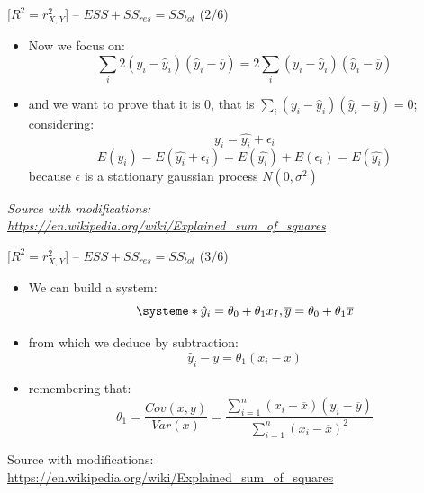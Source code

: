 \documentclass{beamer}
\begin{document}
\begin{frame}
{\centerline{ [$R^2 = r_{X,Y}^2$] -- $ESS + SS_{res} = SS_{tot} $ (2/6)}}

\begin{itemize}
\item Now we focus on:
$$\sum_i2(y_{i}-{\hat {y}}_{i})({\hat {y}}_{i}-{\overline {y}}) = 2\sum_i(y_{i}-{\hat {y}}_{i})({\hat {y}}_{i}-{\overline {y}}) $$
\item and we want to prove that it is 0, that is $\sum_i(y_{i}-{\hat {y}}_{i})({\hat {y}}_{i}-{\overline {y}}) = 0$;  considering:
$$y_i = \hat{y_i} + \epsilon_i$$
$$ E(y_i) = E(\hat{y_i} + \epsilon_i) = E(\hat{y_i}) + E(\epsilon_i) = E(\hat{y_i}) $$
because $\epsilon$ is a stationary gaussian process $N(0,\sigma^2)$

\end{itemize}

\textit{\small
Source with modifications: \url{https://en.wikipedia.org/wiki/Explained_sum_of_squares}}
\end{frame}

\begin{frame}
{\centerline{ [$R^2 = r_{X,Y}^2$] -- $ESS + SS_{res} = SS_{tot} $ (3/6)}}

\begin{itemize}
\item We can build a system:
\[
\systeme*{
\hat{y}_i = \theta_0 + \theta_{1} x_{I},
\overline{y} = \theta_0 + \theta_1 \overline{x}
}
\]
\item from which we deduce by subtraction:
$$\hat{y}_i - \overline{y} = \theta_1 (x_i - \overline{x})$$
\item remembering that:
$$ \theta_1  = \frac { Cov(x,y)} { Var(x) } = {\frac {\sum _{i=1}^{n}(x_{i}-{\overline {x}})(y_{i}-{\overline {y}})}{\sum _{i=1}^{n}(x_{i}-{\overline {x}})^{2}}}$$
\end{itemize}

\begin{center}
\tiny
Source with modifications: \url{https://en.wikipedia.org/wiki/Explained_sum_of_squares}
\end{center}

\end{frame}
\end{document}

